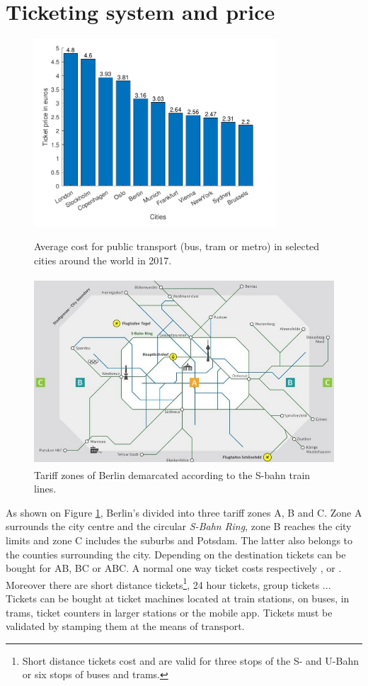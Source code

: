 \section{Ticketing system and price}
\begin{figure}[h]
	\begin{minipage}[c]{0.4\linewidth}
		\centering
		\includegraphics[height=7cm]{Images/GraphPricePT.pdf}
		\caption{Average cost for public transport (bus, tram or metro) in selected cities around the world in 2017\cite{pricesPT}.}
		\label{pricePT}
	\end{minipage}\hfill
	\begin{minipage}[c]{0.5\linewidth}
		\centering
		\includegraphics[height=7cm,width=0.95\linewidth]{Images/tariffZones.jpg}
		\caption{Tariff zones of Berlin demarcated according to the S-bahn train lines\cite{tarif}.}
		\label{tariffZones}
	\end{minipage}
\end{figure}
As shown on Figure \ref{tariffZones}, Berlin's divided into three tariff zones A, B and C. Zone A surrounds the city centre and the circular \textit{S-Bahn Ring}, zone B reaches the city limits and zone C includes the suburbs and Potsdam. The latter also belongs to the counties surrounding the city. Depending on the destination tickets can be bought for AB, BC or ABC\cite{tarif}. A normal one way ticket costs respectively ,  or . Moreover there are short distance tickets\footnote{Short distance tickets cost  and are valid for three stops of the S- and U-Bahn or six stops of buses and trams.}, 24 hour tickets, group tickets ...  Tickets can be bought at ticket machines located at train stations, on buses, in trams, ticket counters in larger stations or the mobile app. Tickets must be validated by stamping them at the means of transport\cite{ticketing1}.

